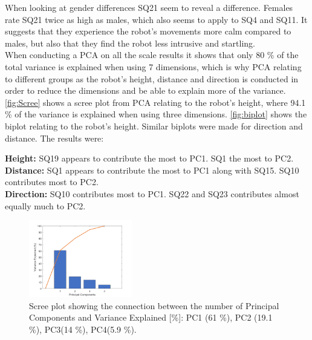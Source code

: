 \noindent
When looking at gender differences SQ21 seem to reveal a difference. Females rate SQ21 twice as high as males, which also seems to apply to SQ4 and SQ11. It suggests that they experience the robot's movements more calm compared to males, but also that they find the robot less intrusive and startling.\\

\noindent
When conducting a PCA on all the scale results it shows that only 80 \% of the total variance is explained when using 7 dimensions, which is why PCA relating to different groups as the robot's height, distance and direction is conducted in order to reduce the dimensions and be able to explain more of the variance. \autoref{fig:Scree} shows a scree plot from PCA relating to the robot's height, where 94.1 \% of the variance is explained when using three dimensions. \autoref{fig:biplot} shows the biplot relating to the robot's height. Similar biplots were made for direction and distance. The results were:

\noindent
\textbullet \textbf{Height:} SQ19 appears to contribute the most to PC1. SQ1 the most to PC2. \\
\textbullet \textbf{Distance:} SQ1 appears to contribute the most to PC1 along with SQ15. SQ10 contributes most to PC2.\\
\textbullet \textbf{Direction:} SQ10 contributes most to PC1. SQ22 and SQ23 contributes almost equally much to PC2.\\
%
\begin{figure}
	\centering
	\includegraphics[width = 0.40\textwidth]{Figure/Scree.png}
	\setlength{} 
	\caption{Scree plot showing the connection between the number of Principal Components and Variance Explained [\%]: PC1 (61 \%), PC2 (19.1 \%), PC3(14 \%), PC4(5.9 \%).}
	\label{fig:Scree}
\end{figure}
\noindent

